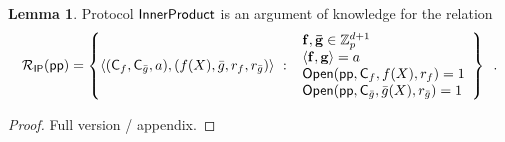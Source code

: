 \documentclass{article}
\theoremstyle{definition}
\newtheorem{lemma}{Lemma}
\begin{document}
\begin{lemma}
    Protocol $\textsf{{InnerProduct}}$ is an argument of knowledge for the relation
\[\mathcal{R}_\mathsf{IP}(\textsf{pp}) = \left\{
    \langle(\mathsf{C}_{f}, \mathsf{C}_{\bar{g}}, a), ({f}(X), \bar{g}, r_f, r_{\bar{g}})\rangle \ : \     \begin{array}{l}
            \mathbf{f}, \mathbf{\bar{g}} \in \mathbb{Z}_p^{d+1} \\
            \langle \mathbf{f}, \mathbf{g} \rangle = a \\
            \textsf{{Open}}(\textsf{pp}, \mathsf{C}_{f}, {f}(X), r_f) = 1 \\
            \textsf{{Open}}(\textsf{pp}, \mathsf{C}_{\bar{g}}, {\bar{g}}(X), r_{\bar{g}}) = 1
        \end{array}
    \right\} \enspace .
\]
\end{lemma}

\begin{proof}
Full version / appendix.
\end{proof}
\end{document}
